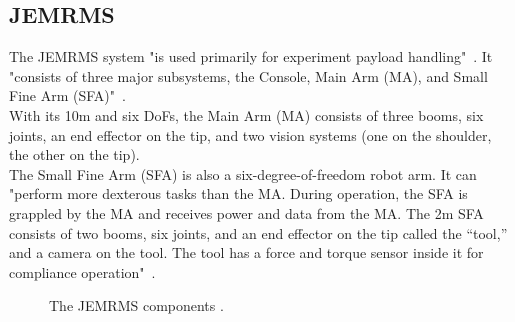 \documentclass[a4paper,12pt,oneside]{report}
\begin{document}
\subsection{JEMRMS}
The JEMRMS system "is used primarily for experiment payload handling"~\cite{four}. It "consists of three major subsystems, the Console, Main Arm (MA), and Small Fine Arm (SFA)"~\cite{eight}.\\
With its 10m and six DoFs, the Main Arm (MA) consists of three booms, six joints, an end effector on the tip, and two vision systems (one on the shoulder, the other on the tip)\cite{eight}.\\
The Small Fine Arm (SFA) is also a six-degree-of-freedom robot arm. It can "perform more dexterous tasks than the MA. During operation, the SFA is grappled by the MA and receives power and data from the MA. The 2m SFA consists of two booms, six joints, and an end effector on the tip called the “tool,” and a camera on the tool. The tool has a force and torque sensor inside it for compliance operation"~\cite{eight}.\\
\begin{figure}[h]
  \centering
   \quad
{} 
  \caption{The JEMRMS components \cite{eight}.}
  \label{JEMRMS_components}
\end{figure}
\end{document}
